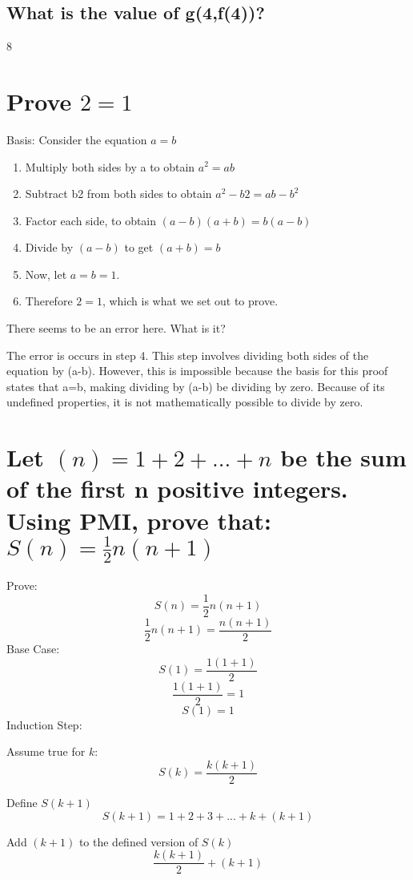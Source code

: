 \documentclass{article}
\begin{document}
\subsection{What is the value of g(4,f(4))?}
\begin{center}
	8
\end{center}

\section{Prove $2 = 1$}
Basis: Consider the equation $a = b$
\begin{enumerate}
	\item Multiply both sides by a to obtain $a^{2} = ab$
	\item Subtract b2 from both sides to obtain $a^2 - b2 = ab - b^2$
	\item Factor each side, to obtain $(a-b)(a+b) = b(a-b)$
	\item Divide by $(a - b)$ to get $(a+b) = b$
	\item Now, let $a = b = 1$.
	\item Therefore $2 = 1$, which is what we set out to prove.
\end{enumerate}
There seems to be an error here.  What is it?

\begin{center}
	The error is occurs in step 4.
	This step involves dividing both sides of the equation by (a-b). However, this is impossible because the basis for this proof states that a=b, making dividing by (a-b) be dividing by zero. Because of its undefined properties, it is not mathematically possible to divide by zero.
\end{center}

\section{Let $(n) = 1 + 2 + ... + n$ be the sum of the first n positive integers. Using PMI, prove that: $S(n) = \frac{1}{2}n(n+1)$}

Prove:
$$S(n) = \frac{1}{2}n(n+1)$$
$$\frac{1}{2}n(n+1) = \frac{n(n+1)}{2}$$
Base Case:
$$S(1) = \frac{1(1+1)}{2}$$
$$\frac{1(1+1)}{2} = 1$$
$$S(1) = 1$$
Induction Step:

Assume true for $k$:
$$S(k) = \frac{k(k+1)}{2}$$

Define $S(k+1)$
$$S(k+1) = 1 + 2 + 3 + ... + k + (k+1)$$

Add $(k+1)$ to the defined version of $S(k)$
$$\frac{k(k+1)}{2}+(k+1)$$
\end{document}
